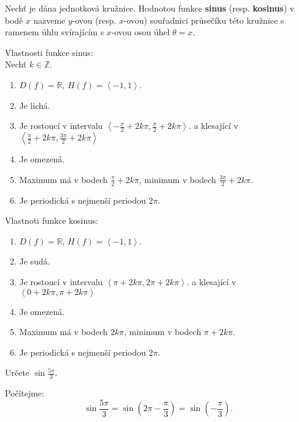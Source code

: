 \begin{definition}
  Nechť je dána jednotková kružnice. Hodnotou funkce \textbf{sinus} (resp. \textbf{kosinus})
  v bodě $x$ nazveme $y$-ovou (resp. $x$-ovou) souřadnici průsečíku této kružnice s ramenem
  úhlu svírajícím s $x$-ovou osou úhel $\theta = x$.
\end{definition}

\begin{veta}
    Vlastnosti funkce sinus:\\
    Nechť $k\in \mathbb Z.$
    \begin{enumerate}[$i.$]
        \item $D(f)= \mathbb R$, $H(f)= \left < -1,1 \right > $.
       	\item Je lichá.
        \item Je rostoucí v intervalu $\left < -\frac{\pi}{2}+2k\pi, \frac{\pi}{2}+2k\pi \right > $.
        a klesající v $\left < \frac{\pi}{2}+2k\pi, \frac{3\pi}{2}+2k\pi \right > $
        \item Je omezená.
        \item Maximum má v bodech $\frac{\pi}{2}+2k\pi$, minimum v bodech $\frac{3\pi}{2}+2k\pi.$
        \item Je periodická s nejmenší periodou $2\pi.$
    \end{enumerate}
    Vlastnoti funkce kosinus:
    \begin{enumerate}[$i.$]
        \item $D(f)= \mathbb R$, $H(f)= \left < -1,1 \right > $.
       	\item Je sudá.
        \item Je rostoucí v intervalu $\left < \pi+2k\pi, 2\pi+2k\pi \right > $.
        a klesající v $\left < 0+2k\pi, \pi+2k\pi \right > $
        \item Je omezená.
        \item Maximum má v bodech $2k\pi$, minimum v bodech $\pi+2k\pi.$
        \item Je periodická s nejmenší periodou $2\pi.$
    \end{enumerate}
\end{veta}

\begin{priklad}
Určete $\sin \frac{5\pi}{3}.$
\end{priklad}

\begin{reseni}
Počítejme:
$$\sin \frac{5\pi}{3}=\sin \left ( 2\pi-\frac{\pi}{3} \right ) =\sin \left ( -\frac{\pi}{3} \right ). $$
\end{reseni}

